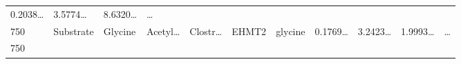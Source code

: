 \documentclass[
]{article}
\begin{document}
\begin{longtable}[]{@{}lllllllllll@{}}
\begin{minipage}[t]{0.07\columnwidth}
0.2038\ldots{}\strut
\end{minipage} & \begin{minipage}[t]{0.07\columnwidth}\raggedright
3.5774\ldots{}\strut
\end{minipage} & \begin{minipage}[t]{0.07\columnwidth}\raggedright
8.6320\ldots{}\strut
\end{minipage} & \begin{minipage}[t]{0.03\columnwidth}\raggedright
\ldots{}\strut
\end{minipage}\tabularnewline
\begin{minipage}[t]{0.05\columnwidth}\raggedright
750\strut
\end{minipage} & \begin{minipage}[t]{0.07\columnwidth}\raggedright
Substrate\strut
\end{minipage} & \begin{minipage}[t]{0.07\columnwidth}\raggedright
Glycine\strut
\end{minipage} & \begin{minipage}[t]{0.09\columnwidth}\raggedright
Acetyl\ldots{}\strut
\end{minipage} & \begin{minipage}[t]{0.07\columnwidth}\raggedright
Clostr\ldots{}\strut
\end{minipage} & \begin{minipage}[t]{0.07\columnwidth}\raggedright
EHMT2\strut
\end{minipage} & \begin{minipage}[t]{0.09\columnwidth}\raggedright
glycine\strut
\end{minipage} & \begin{minipage}[t]{0.07\columnwidth}\raggedright
0.1769\ldots{}\strut
\end{minipage} & \begin{minipage}[t]{0.07\columnwidth}\raggedright
3.2423\ldots{}\strut
\end{minipage} & \begin{minipage}[t]{0.07\columnwidth}\raggedright
1.9993\ldots{}\strut
\end{minipage} & \begin{minipage}[t]{0.03\columnwidth}\raggedright
\ldots{}\strut
\end{minipage}\tabularnewline
\begin{minipage}[t]{0.05\columnwidth}\raggedright
750\strut
\end{minipage} & \begin{minipage}[t]{0.07\columnwidth}\raggedright

\end{minipage}
\end{longtable}
\end{document}
